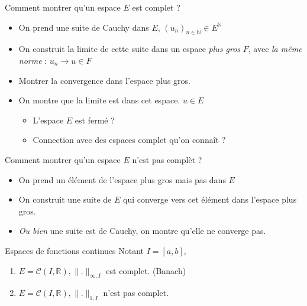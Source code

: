 \begin{note}{Comment montrer qu'un espace $E$ est complet ?}{}
\begin{itemize}
  \item On prend une suite de Cauchy dans $E$, $(u_n)_{n \in \mathbb{N}} \in E ^\mathbb{N}$
  \item On construit la limite de cette suite dans un espace \textit{plus gros} $F$, avec \textit{la même norme} : $u_n \to u \in F$
  \item Montrer la convergence dans l'espace plus gros.
  \item On montre que la limite est dans cet espace. $u \in E$
    \begin{itemize}
      \item L'espace $E$ est fermé ?
      \item Connection avec des espaces complet qu'on connaît ?
    \end{itemize}
\end{itemize}

Comment montrer qu'un espace $E$ n'est pas complèt ?
\begin{itemize}
  \item On prend un élément de l'espace plus gros mais pas dans $E$
  \item On construit une suite de $E$ qui converge vers cet élément dans l'espace plus gros. 
  \item \textit{Ou bien } une suite est de Cauchy, on montre qu'elle ne converge pas.
\end{itemize}
\end{note}

\begin{Example}{Espaces de fonctions continues}{}
  Notant $I = [a, b]$,
\begin{enumerate}
  \item $E = \mathscr{C}(I, \mathbb{R}), \| .\|_{\infty, I}$ est complet. (Banach)
  \item $E = \mathscr{C}(I, \mathbb{R}), \| .\|_{1, I}$ n'est pas complet.
\end{enumerate}
\end{Example}

